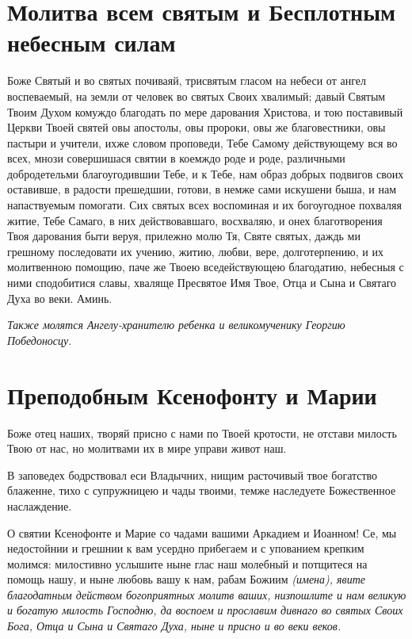 \section{Молитва всем святым и Бесплотным небесным силам}\begin{mymulticols}



Боже Святый и во святых почиваяй, трисвятым гласом на небеси от ангел воспеваемый, на земли от человек во святых Своих хвалимый; давый Святым Твоим Духом комуждо благодать по мере дарования Христова, и тою поставивый Церкви Твоей святей овы апостолы, овы пророки, овы же благовестники, овы пастыри и учители, ихже словом проповеди, Тебе Самому действующему вся во всех, мнози совершишася святии в коемждо роде и роде, различными добродетельми благоугодившии Тебе, и к Тебе, нам образ добрых подвигов своих оставивше, в радости прешедшии, готови, в немже сами искушени быша, и нам напаствуемым помогати. Сих святых всех воспоминая и их богоугодное похваляя житие, Тебе Самаго, в них действовавшаго, восхваляю, и онех благотворения Твоя дарования быти веруя, прилежно молю Тя, Святе святых, даждь ми грешному последовати их учению, житию, любви, вере, долготерпению, и их молитвенною помощию, паче же Твоею вседействующею благодатию, небесныя с ними сподобитися славы, хваляще Пресвятое Имя Твое, Отца и Сына и Святаго Духа во веки. Аминь.

\itshape Также молятся Ангелу-хранителю ребенка и великомученику Георгию Победоносцу.

\normalfont{}


\end{mymulticols}

\section{Преподобным Ксенофонту и Марии}\begin{mymulticols}



Боже отец наших, творяй присно с нами по Твоей кротости, не отстави милость Твою от нас, но молитвами их в мире управи живот наш.




В заповедех бодрствовал еси Владычних, нищим расточивый твое богатство блаженне, тихо с супружницею и чады твоими, темже наследуете Божественное наслаждение.




О святии Ксенофонте и Марие со чадами вашими Аркадием и Иоанном! Се, мы недостойнии и грешнии к вам усердно прибегаем и с упованием крепким молимся: милостивно услышите ныне глас наш молебный и потщитеся на помощь нашу, и ныне любовь вашу к нам, рабам Божиим \itshape (имена)\normalfont{}, явите благодатным действом богоприятных молитв ваших, низпошлите и нам великую и богатую милость Господню, да воспоем и прославим дивнаго во святых Своих Бога, Отца и Сына и Святаго Духа, ныне и присно и во веки веков.

\end{mymulticols}

